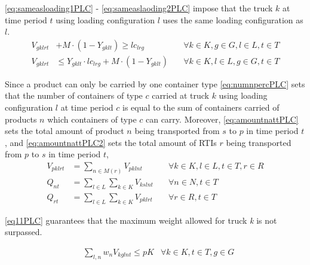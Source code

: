 \eqref{eq:sameasloading1PLC} - \eqref{eq:sameaslaoding2PLC} impose that  the truck $k$ at time period $t$ using loading configuration $l$ uses the same loading configuration as $l$.
\begin{align}
  V_{gklrt} & +M\cdot (1-Y_{gklt})\ge lc_{lrg}               & \quad \forall k \in K,g \in G,l \in L,t \in T\label{eq:sameasloading1PLC} \\
  V_{gklrt} & \le Y_{gklt}\cdot lc_{lrg}+M\cdot (1-Y_{gklt}) & \quad \forall k \in K,l \in L,g \in G,t \in T\label{eq:sameaslaoding2PLC}
\end{align}

Since a product can only be carried by one container type \eqref{eq:numnpercPLC} sets that the number of containers of type $c$ carried at truck $k$ using loading configuration $l$ at time period $c$ is equal to the sum of containers carried of products $n$ which containers of type $c$ can carry. Moreover, \eqref{eq:amountnattPLC} sets the total amount of product $n$ being transported from $s$ to $p$ in time period $t$, and \eqref{eq:amountnattPLC2} sets the total amount of RTIs $r$ being transported from $p$ to $s$ in time period $t$,
\begin{align}
  V_{pklrt} & =\sum_{n \in M(r)}{V_{pklnt}}\quad              & \forall k \in K,l \in L,t \in T,r \in R \label{eq:numnpercPLC} \\
  Q_{nt}    & =\sum_{l \in L}{\sum_{k \in K}{V_{kslnt}}}\quad & \forall n \in N,t \in T\label{eq:amountnattPLC}                \\
  Q_{rt}    & =\sum_{l \in L}{\sum_{k \in K}{V_{pklrt}}}\quad & \forall r \in R,t \in T\label{eq:amountnattPLC2}
\end{align}


\eqref{eq11PLC} guarantees that the maximum weight allowed for truck \textit{k} is not surpassed.

\begin{align}
   & \sum_{l,n} w_{n}V_{kglnt} \leq pK & \forall k\in K,t\in T, g \in G \label{eq11PLC}
\end{align}

